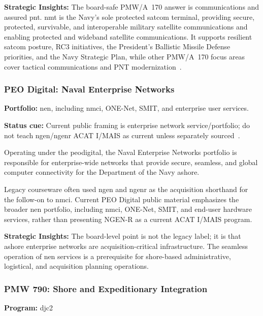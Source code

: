 \documentclass[../main.tex]{subfiles}
\begin{document}
\textbf{Strategic Insights:} The board-safe PMW/A~170 answer is communications and assured \ac{pnt}. \ac{nmt} is the Navy's sole protected \ac{satcom} terminal, providing secure, protected, survivable, and interoperable military satellite communications and enabling protected and wideband satellite communications. It supports resilient \ac{satcom} posture, RC3 initiatives, the President's Ballistic Missile Defense priorities, and the Navy Strategic Plan, while other PMW/A~170 focus areas cover tactical communications and PNT modernization~\autocite{PEOC4I-PMW170-tearsheet-2025,NAVAIR-PMWA170}.

\subsubsection{PEO Digital: Naval Enterprise Networks}
\label{ssubsec:pmw205}

\textbf{Portfolio:} \ac{nen}, including \ac{nmci}, ONE-Net, SMIT, and enterprise user services.

\textbf{Status cue:} Current public framing is enterprise network service/portfolio; do not teach \ac{ngen}/\ac{ngenr} ACAT I/MAIS as current unless separately sourced~\autocite{PEODigital-portfolio-overview-2023}.

Operating under the \ac{peodigital}, the Naval Enterprise Networks portfolio is responsible for enterprise-wide networks that provide secure, seamless, and global computer connectivity for the Department of the Navy ashore.

Legacy courseware often used \ac{ngen} and \ac{ngenr} as the acquisition shorthand for the follow-on to \ac{nmci}. Current PEO Digital public material emphasizes the broader \ac{nen} portfolio, including \ac{nmci}, ONE-Net, SMIT, and end-user hardware services, rather than presenting NGEN-R as a current ACAT I/MAIS program.

\textbf{Strategic Insights:} The board-level point is not the legacy label; it is that ashore enterprise networks are acquisition-critical infrastructure. The seamless operation of \ac{nen} services is a prerequisite for shore-based administrative, logistical, and acquisition planning operations.

\subsubsection{PMW 790: Shore and Expeditionary Integration}
\label{ssubsec:pmw790}

\textbf{Program:} \ac{djc2}
\end{document}
